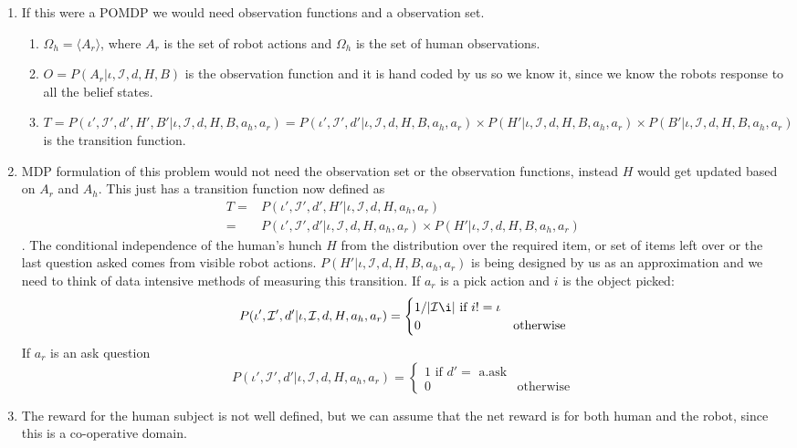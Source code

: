 \documentclass{article}
\newcommand{\myitem}{\stepcounter{enumi}\item[$*$\theenumi.]}
\begin{document}
\begin{enumerate}
	\item If this were a POMDP we would need observation functions and a observation set. \begin{enumerate}
	
	

	
	\item $\Omega_h  = \langle A_r \rangle$, where $A_r$ is the set of robot actions and $\Omega_h$ is the set of human observations.
	
	\item $O = P(A_r | \iota, \mathcal{I}, d, H, B)$ is the observation function and it is hand coded by us so we know it, since we know the robots response to all the belief states.
	
	\item $T = P(\iota', \mathcal{I}',d',H',B' |\iota, \mathcal{I},d,H,B, a_h,a_r) = P(\iota', \mathcal{I}',d'|\iota, \mathcal{I},d,H,B, a_h,a_r) \times P(H' |\iota, \mathcal{I},d,H,B, a_h,a_r) \times P(B' |\iota, \mathcal{I},d,H,B, a_h,a_r)$  is the transition function.
	
	\end{enumerate}
	
	\myitem MDP formulation of this problem would not need the observation set or the observation functions, instead $H$ would get updated based on $A_r$ and $A_h$. This just has a transition function now defined as\\
	\begin{eqnarray}
	T =& P(\iota', \mathcal{I}',d',H'|\iota, \mathcal{I},d,H, a_h,a_r)\\ =& P(\iota', \mathcal{I}',d'|\iota, \mathcal{I},d,H, a_h,a_r) \times P(H' |\iota, \mathcal{I},d,H,B, a_h,a_r)
	\end{eqnarray}. 
	The conditional independence of the human's hunch $H$ from the distribution over the required item, or set of items left over or the last question asked comes from visible robot actions.
	$P(H' |\iota, \mathcal{I},d,H,B, a_h,a_r)$ is being designed by us as an approximation and we need to think of data intensive methods of measuring this transition.
	If $a_r$ is a pick action and $i$ is the object picked:
	\begin{equation}
	P(\iota', \mathcal{I}',d'|\iota, \mathcal{I},d,H, a_h,a_r) =  \begin{cases}
	1/|\mathcal{I}\i| \text{ if $i!= \iota$} \\
	0 & \text{otherwise}
	\end{cases}
	\end{equation}
	If $a_r$ is an ask question 
	\begin{equation}
	P(\iota', \mathcal{I}',d'|\iota, \mathcal{I},d,H, a_h,a_r) =  \begin{cases}
	1 \text{ if $d' =$ a.ask} \\
	0 & \text{otherwise}
	\end{cases}
	\end{equation}
	
	\item The reward for the human subject is not well defined, but we can assume that the net reward is for both human and the robot, since this is a co-operative domain.
\end{enumerate}	
	
\end{document}
